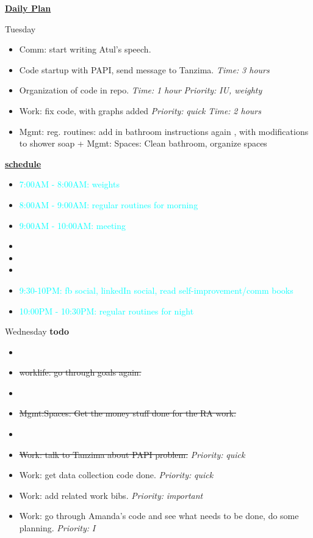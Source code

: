 \documentclass[serif,mathserif,final]{beamer}
\newcommand{\doneTask}[1]{\item \sout{#1}}
\newcommand{\timeEst}[1]{\textit{Time:} \textit{#1}}
\newcommand{\priority}[1]{\textit{Priority:} \textit{#1}}
\newcommand{\regItem}[1]{\item \textcolor{cyan}{#1}}
\begin{document}
\begin{frame}{}
\begin{columns}[t]
\begin{column}{0.27\linewidth}{\textbf{\underline{Daily Plan}}}
{\begin{block}{\small Tuesday}
\begin{itemize}
\item \tiny Comm: start writing Atul's speech. 


  \item \tiny Code startup with PAPI, send message to Tanzima. \timeEst{3 hours} 
  \item \tiny Organization of code in repo. \timeEst{1 hour} \priority{IU, weighty} 
  \item \tiny Work: fix code, with graphs added \priority{quick} \timeEst{2 hours} 

  \item \tiny Mgmt: reg. routines: add in bathroom instructions again , with modifications to shower soap +  Mgmt: Spaces: Clean bathroom, organize spaces 
  \end{itemize} 
  
\underline{\textbf{schedule}}\\
\begin{itemize}
\regItem{7:00AM - 8:00AM: weights}
\regItem{8:00AM - 9:00AM: regular routines for morning}
\regItem{9:00AM - 10:00AM: meeting} 
\item \tiny 
\item \tiny 
\item \tiny 
\regItem{9:30-10PM: fb social, linkedIn social, read self-improvement/comm books}
\regItem{10:00PM - 10:30PM: regular routines for night} 
\end{itemize} 
\end{block} 

\begin{block} {\small Wednesday}
\textbf{todo} \\
  \begin{itemize} 
  \item \doneTask{\tiny worklife: go through goals again.}
  \item \doneTask{\tiny  Mgmt:Spaces:  Get the money stuff done for the RA work.} 
    


  \item \doneTask{Work: talk to Tanzima about PAPI problem. } \priority{quick} 

  \item \tiny Work: get data collection code done. \priority{quick} 
  \item \tiny Work: add related work bibs.  \priority{important} 
  \item \tiny Work: go through Amanda's code and see what needs to be done, do some planning. \priority{I} 


\end{itemize}
\end{block}}
\end{column}
\end{columns}
\end{frame}
\end{document}
